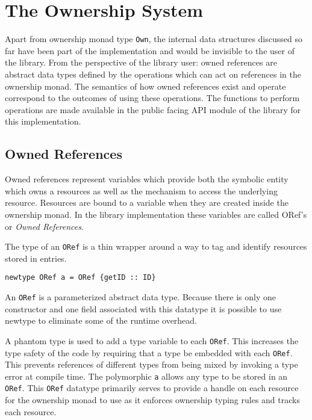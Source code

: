 \documentclass[onehalf,11pt]{beavtex}
\begin{document}
\section{The Ownership System}

Apart from ownership monad type \texttt{Own}, the internal data structures
discussed so far have been part of the implementation and would be invisible to
the user of the library.
From the perspective of the library user: owned references are abstract
data types defined by the operations which can act on references in the
ownership monad.
The semantics of how owned references exist and operate correspond to the
outcomes of using these operations.
The functions to perform operations are made available in the public facing API
module of the library for this implementation.

\subsection{Owned References}

Owned references represent variables which provide both the symbolic entity
which owns a resources as well as the mechanism to access the underlying resource.
Resources are bound to a variable when they are created inside the ownership
monad. In the library implementation these variables are called ORef's or
\textit{Owned References}.

The type of an \texttt{ORef} is a thin wrapper around a way to tag and identify
resources stored in entries.

\begin{verbatim}
newtype ORef a = ORef {getID :: ID}
\end{verbatim}

An \texttt{ORef} is a parameterized abstract data type. Because there is only
one constructor and one field associated with this datatype it is possible to
use newtype to eliminate some of the runtime overhead.

A phantom type is used to add a type variable to each \texttt{ORef}. This
increases the type safety of the code by requiring that a type be embedded
with each \texttt{ORef}.
This prevents references of different types from being mixed by invoking a
type error at compile time.
The polymorphic \texttt{a} allows any type to be stored in an \texttt{ORef}.
This \texttt{ORef} datatype primarily serves to provide a handle on each
resource for the ownership monad to use as it enforces ownership typing rules
and tracks each resource.
\end{document}
